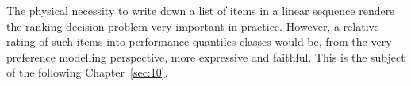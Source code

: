 \vspace{1cm}
The physical necessity to write down a list of items in a linear sequence renders the ranking decision problem very important in practice. However, a relative rating of such items into performance quantiles classes would be, from the very preference modelling perspective, more expressive and faithful. This is the subject of the following Chapter~\ref{sec:10}.


\clearpage
%


